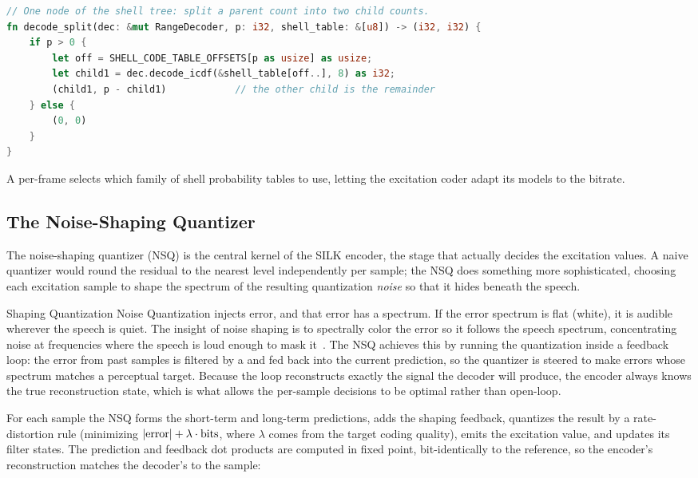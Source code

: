 \begin{lstlisting}[language=Rust]
// One node of the shell tree: split a parent count into two child counts.
fn decode_split(dec: &mut RangeDecoder, p: i32, shell_table: &[u8]) -> (i32, i32) {
    if p > 0 {
        let off = SHELL_CODE_TABLE_OFFSETS[p as usize] as usize;
        let child1 = dec.decode_icdf(&shell_table[off..], 8) as i32;
        (child1, p - child1)            // the other child is the remainder
    } else {
        (0, 0)
    }
}
\end{lstlisting}

A per-frame  selects which family of shell probability
tables to use, letting the excitation coder adapt its models to the bitrate.

\subsection{The Noise-Shaping Quantizer}\label{subsec:silk_nsq}

The noise-shaping quantizer (NSQ) is the central kernel of the SILK encoder, the
stage that actually decides the excitation values. A naive quantizer would round
the residual to the nearest level independently per sample; the NSQ does
something more sophisticated, choosing each excitation sample to shape the
spectrum of the resulting quantization \emph{noise} so that it hides beneath the
speech.

\begin{concept}{Shaping Quantization Noise}
  Quantization injects error, and that error has a spectrum. If the error
  spectrum is flat (white), it is audible wherever the speech is quiet. The
  insight of noise shaping is to spectrally color the error so it follows the
  speech spectrum, concentrating noise at frequencies where the speech is loud
  enough to mask it~\cite{rabiner1978digital}. The NSQ achieves this by running
  the quantization inside a feedback loop: the error from past samples is
  filtered by a  and fed back into the current
  prediction, so the quantizer is steered to make errors whose spectrum matches a
  perceptual target. Because the loop reconstructs exactly the signal the decoder
  will produce, the encoder always knows the true reconstruction state, which is
  what allows the per-sample decisions to be optimal rather than open-loop.
\end{concept}

For each sample the NSQ forms the short-term and long-term predictions, adds the
shaping feedback, quantizes the result by a rate-distortion rule (minimizing
$\lvert\text{error}\rvert + \lambda \cdot \text{bits}$, where $\lambda$ comes from the
target coding quality), emits the excitation value, and updates its filter
states. The prediction and feedback dot products are computed in fixed point,
bit-identically to the reference, so the encoder's reconstruction matches the
decoder's to the sample:


